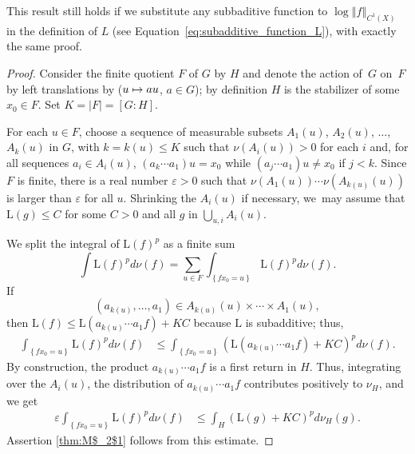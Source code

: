 \documentclass[11pt]{article}
\newcommand\mto{\mathchoice{\longmapsto}{\mapsto}{\mapsto}{\mapsto}}
\let\e\varepsilon
\newcommand{\set}[1]{\left\{#1\right\}}
\newcommand{\norm}[1]{{\left\Vert#1\right\Vert}}
\theoremstyle{plain}
\theoremstyle{definition}
\numberwithin{equation}{section}
\begin{document}
This result still holds if we substitute any subbaditive function to $ \log\norm{f}_{C^1(X)}$ in the definition of $L$ (see Equation~\ref{eq:subadditive_function_L}), with exactly the same proof.
\begin{proof}
Consider the finite quotient $F$ of $G$ by $H$ and denote the action of~$G$ on~$F$ by left translations by ($u\mto au$, $a\in G$); by definition $H$ is the stabilizer of some $x_0\in F$. Set $K=\vert F\vert = [G: H]$.

For each $u\in F$, choose a sequence of measurable subsets $A_1(u)$, $A_2(u)$, $\ldots$, $A_k(u)$ in $G$, with $k=k(u)\leq K$
such that $\nu(A_i(u))>0$ for each $i$ and, for all sequences $a_i\in A_i(u)$, $(a_k \cdots a_1) u= x_0$
while $(a_j \cdots a_1) u\neq x_0$ if $j<k$. Since $F$ is finite, there is a real
number $\e >0$ such that $\nu(A_1(u))\cdots \nu(A_{k(u)}(u))$ is larger than $\e$ for all $u$. Shrinking the $A_i(u)$ if necessary, we~may assume that $\mathrm L(g)\leq C$ for some $C>0$ and all $g$ in $\bigcup_{u,i}A_i(u)$.

We split the integral of $ \mathrm L(f)^p$ as a finite sum\vspace*{-3pt}
\[
\int \mathrm L(f)^pd\nu(f) = \sum_{u\in F}\int_{\set{fx_0=u }} \mathrm L(f)^pd\nu(f).
\]
If\vspace*{-5pt}
\begin{equation*}
(a_{k(u)}, \ldots, a_1)\in A_{k(u)}(u)\times \cdots \times A_1(u),
\end{equation*}
then $\mathrm L(f)\leq \mathrm L(a_{k(u)} \cdots a_1 f)+K C$ because $\mathrm L$ is subadditive; thus,\vspace*{-3pt}
\begin{align*}
\int_{\set{fx_0=u }} \mathrm L(f)^pd\nu(f) & \leq \int_{\set{fx_0=u }} (\mathrm L(a_{k(u)} \cdots a_1 f)+KC)^pd\nu(f).
\end{align*}
By construction, the product $a_{k(u)} \cdots a_1 f$ is a first return in $H$. Thus,
integrating over the $A_i(u)$, the distribution of $a_{k(u)} \cdots a_1 f$ contributes positively
to $\nu_H$, and we get
\begin{align*}
\e \int_{\set{fx_0=u }} \mathrm L(f)^pd\nu(f) & \leq \int_H (\mathrm L(g)+KC)^pd\nu_H(g).
\end{align*}
Assertion \eqref{thm:M$_2$1} follows from this estimate.


\end{proof}
\end{document}

